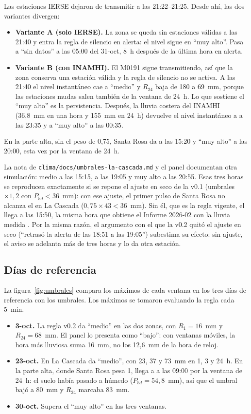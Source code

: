 \documentclass{sosg-informe}
\begin{document}
Las estaciones IERSE dejaron de transmitir a las 21:22--21:25. Desde ahí, las dos variantes divergen:
\begin{itemize}
  \item \textbf{Variante A (solo IERSE).} La zona se queda sin estaciones válidas a las 21:40 y entra la regla de silencio en alerta: el nivel sigue en \enquote{muy alto}. Pasa a \enquote{sin datos} a las 05:00 del 31-oct, 8~h después de la última hora en alerta.
  \item \textbf{Variante B (con INAMHI).} El M0191 sigue transmitiendo, así que la zona conserva una estación válida y la regla de silencio no se activa. A las 21:40 el nivel instantáneo cae a \enquote{medio} y $R_{24}$ baja de 180 a 69~mm, porque las estaciones mudas salen también de la ventana de 24~h. Lo que sostiene el \enquote{muy alto} es la persistencia. Después, la lluvia costera del INAMHI (36,8~mm en una hora y 155~mm en 24~h) devuelve el nivel instantáneo a \alto{} a las 23:35 y a \enquote{muy alto} a las 00:35.
\end{itemize}

En la parte alta, sin el peso de 0,75, Santa Rosa da \alto{} a las 15:20 y \enquote{muy alto} a las 20:00, esta vez por la ventana de 24~h.

La nota de \texttt{clima/docs/umbrales-la-cascada.md} y el panel documentan otra simulación: medio a las 15:15, \alto{} a las 19:05 y muy alto a las 20:55. Esas tres horas se reproducen exactamente si se repone el ajuste en seco de la v0.1 (umbrales $\times 1{,}2$ con $P_{5d} < 36$~mm): con ese ajuste, el primer pulso de Santa Rosa no alcanza el \alto{} en La Cascada ($0{,}75 \times 43 < 36$~mm). Sin él, que es la regla vigente, el \alto{} llega a las 15:50, la misma hora que obtiene el Informe 2026-02 con la lluvia medida \citep{maya2026idf}. Por la misma razón, el argumento con el que la v0.2 quitó el ajuste en seco (\enquote{retrasó la alerta de las 18:51 a las 19:05}) subestima su efecto: sin ajuste, el aviso se adelanta más de tres horas y lo da otra estación.

\subsection{Días de referencia}
La figura~\ref{fig:umbrales} compara los máximos de cada ventana en los tres días de referencia con los umbrales. Los máximos se tomaron evaluando la regla cada 5~min.
\begin{itemize}
  \item \textbf{3-oct.} La regla v0.2 da \enquote{medio} en las dos zonas, con $R_1 = 16$~mm y $R_{24} = 68$~mm. El panel lo presenta como \enquote{bajo}: con ventanas móviles, la hora más lluviosa suma 16~mm, no los 12,6~mm de la hora de reloj.
  \item \textbf{23-oct.} En La Cascada da \enquote{medio}, con 23, 37 y 73~mm en 1, 3 y 24~h. En la parte alta, donde Santa Rosa pesa 1, llega a \alto{} a las 09:00 por la ventana de 24~h: el suelo había pasado a húmedo ($P_{5d} = 54{,}8$~mm), así que el umbral bajó a 80~mm y $R_{24}$ marcaba 83~mm.
  \item \textbf{30-oct.} Supera el \enquote{muy alto} en las tres ventanas.
\end{itemize}
\end{document}
